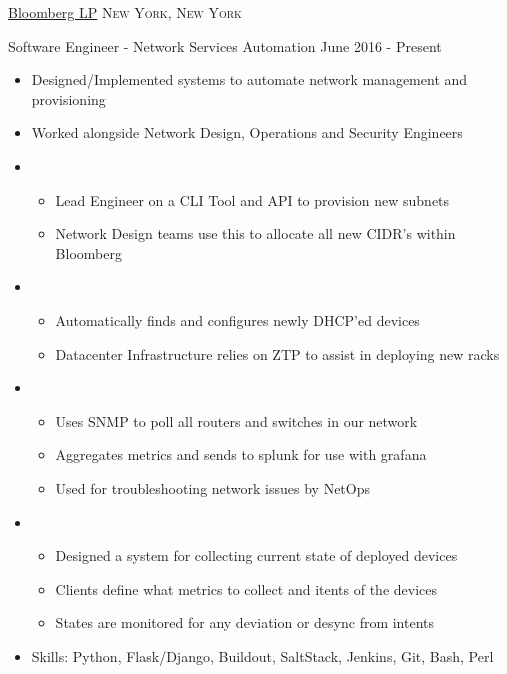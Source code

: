 \documentclass[11pt]{article}
\begin{document}
\headedsection  %
{\href{http://www.bloomberg.com/}{Bloomberg LP}}
{\textsc{New York, New York}}
{
    \headedsubsection
    {Software Engineer - Network Services Automation}
    {June 2016 - Present}
    {
        \begin{itemize}
            \item Designed/Implemented systems to automate network management and provisioning
            \item Worked alongside Network Design, Operations and Security Engineers
            \item{}
            { \begin{itemize}
                \item Lead Engineer on a CLI Tool and API to provision new subnets 
                \item Network Design teams use this to allocate all new CIDR's within Bloomberg
                \end{itemize} }
            \item{}
            {   \begin{itemize}
                \item Automatically finds and configures newly DHCP'ed devices
                \item Datacenter Infrastructure relies on ZTP to assist in deploying new racks
                \end{itemize} }
            \item{}
            { \begin{itemize}
                \item Uses SNMP to poll all routers and switches in our network
                \item Aggregates metrics and sends to splunk for use with grafana
                \item Used for troubleshooting network issues by NetOps
                \end{itemize} }
            \item{}
            { \begin{itemize}
                \item Designed a system for collecting current state of deployed devices
                \item Clients define what metrics to collect and itents of the devices
                \item States are monitored for any deviation or desync from intents
                \end{itemize} }
            \item Skills: Python, Flask/Django, Buildout, SaltStack, Jenkins, Git, Bash, Perl
        \end{itemize}

    }
}
\end{document}
